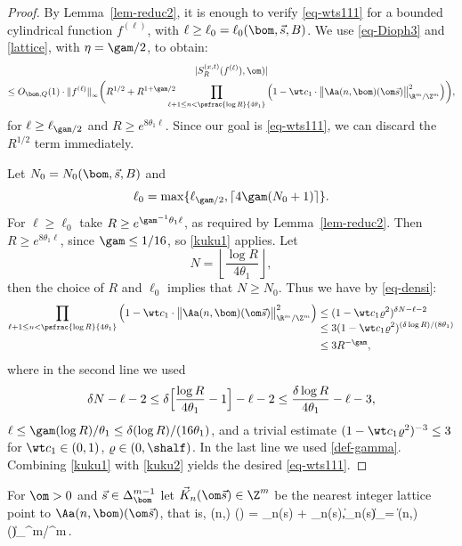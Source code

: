\begin{proof}
By Lemma~\ref{lem-reduc2}, it is enough to verify \eqref{eq-wts111} for a bounded cylindrical function $f^{(\ell)}$, with $\ell \ge \ell_0=\ell_0(\bom,\vec s, B)$.
We use \eqref{eq-Dioph3} and \eqref{lattice}, with $\eta = \gam/2$, to obtain:
\begin{multline}
\label{kuku1}
|S^{(x,t)}_R(f^{(\ell)}),\om)|\\
\le O_{\bom,Q}(1)\cdot \|f^{(\ell)}\|_{_\infty} \biggl(R^{1/2}+ R^{1+\gam/2}\!\!\!\!\!\!\prod_{\ell+1\le n < \psfrac{\log R}{4\theta_1}}
\left( 1 - \wt c_1\cdot \bigl\|\Aa(n,\bom) (\om\vec{s})\bigr\|^2_{\R^m/\Z^m} \right)
\biggr),
\end{multline}
for $\ell\ge \ell_{\gam/2}$ and
$R\ge e^{8\theta_1\ell}$.
Since our goal is \eqref{eq-wts111},
we can discard the $R^{1/2}$ term immediately.

Let $N_0 = N_0(\bom,\vec s, B)$ and
\[
\ell_0 =\max\{ \ell_{\gam/2}, \lceil 4\gam (N_0+1)\rceil\}.
\]
For $\ell\ge \ell_0$ take $R\ge e^{\gam^{-1}\theta_1 \ell}$, as required by Lemma~\ref{lem-reduc2}. Then $R\ge e^{8\theta_1\ell}$, since $\gam\le 1/16$, so \eqref{kuku1} applies.
Let
\[
N = \left\lfloor\frac{\log R}{4\theta_1}\right\rfloor,
\]
then the choice of $R$ and $\ell_0$ implies that $N\ge N_0$. Thus we have by \eqref{eq-densi}:
\begin{equation}
\label{kuku2}
\begin{split}
\prod_{\ell+1\le n < \psfrac{\log R}{4\theta_1}}
\left( 1 - \wt c_1\cdot \bigl\|\Aa(n,\bom) (\om\vec{s})\bigr\|^2_{\R^m/\Z^m} \right)
& \le (1-\wt c_1 \varrho^2)^{\delta N-\ell-2} \\[-3.3ex]
& \le 3 (1-\wt c_1 \varrho^2)^{(\delta \log R)/(8\theta_1)} \\
& \le 3 R^{-\gam}, 
\end{split}
\end{equation}
where in the second line we used
\[
\delta N - \ell - 2 \le \delta \Bigl[\frac{\log R}{4\theta_1} - 1\Bigr] -\ell-2 \le \frac{\delta\log R}{4\theta_1} - \ell- 3,
\]
$\ell\le\gam(\log R)/\theta_1\le\delta(\log R)/(16\theta_1)$, and a trivial estimate $(1-\wt c_1 \varrho^2)^{-3}\le3$ for \hbox{$\wt c_1\in(0,1)$}, $\varrho\in (0,\shalf)$. In the last line we used \eqref{def-gamma}.
Combining \eqref{kuku1} with \eqref{kuku2} yields the desired \eqref{eq-wts111}.
\end{proof}

For $\om >0$ and $\vec s\in \Delta_\bom^{m-1}$ let $\vec K_n(\om\vec s)\in \Z^m$ be the nearest integer lattice point to $\Aa(n,\bom) (\om\vec{s})$, that is,
\be \label{def-eps}
\Aa(n,\bom) (\om{}) = _n(\om\vec s) + \vec{\eps}_n(\om\vec s),\quad \|\vec{\eps}_n(\om\vec s)\|_\infty = \bigl\|\Aa(n,\bom) (\om{})\bigr\|_{\R^m/\Z^m}\,.
\ee

